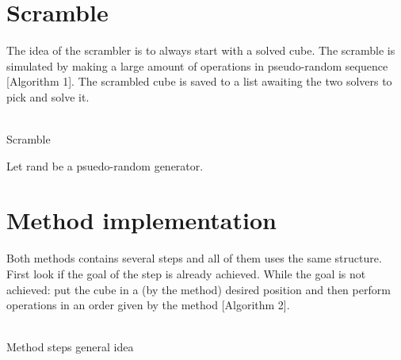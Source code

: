 \documentclass[a4paper,11pt]{kth-mag}
\begin{document}
\section{Scramble}
The idea of the scrambler is to always start with a solved cube. The scramble is simulated by making a large amount of operations in pseudo-random sequence [Algorithm 1]. The scrambled cube is saved to a list awaiting the two solvers to pick and solve it.\\\\
	\begin{algorithm}[H]
	\caption{Scramble}
	Let rand be a psuedo-random generator.\\

	\end{algorithm}

\section{Method implementation}
	Both methods contains several steps and all of them uses the same structure. First look if the goal of the step is already achieved. While the goal is not achieved: put the cube in a (by the method) desired position and then perform operations in an order given by the method [Algorithm 2]. \\\\
	\begin{algorithm}[H]
	\caption{Method steps general idea}
	\end{algorithm}

	
\end{document}
